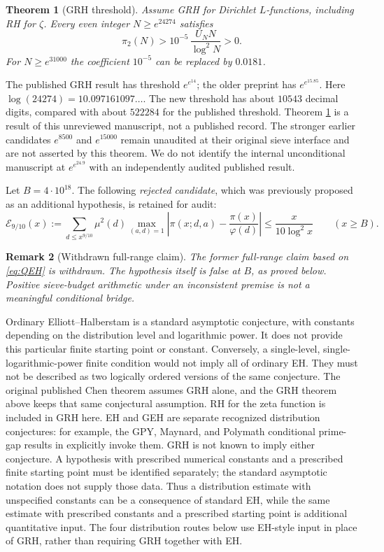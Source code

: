 \documentclass[11pt]{article}
\newtheorem{theorem}{Theorem}
\newtheorem{remark}[theorem]{Remark}
\begin{document}
\begin{theorem}[GRH threshold]\label{thm:grh}
Assume GRH for Dirichlet $L$-functions, including RH for $\zeta$.
Every even integer $N\ge e^{24274}$ satisfies
\[
\pi_2(N)>10^{-5}\,\frac{U_NN}{\log^2N}>0.
\]
For $N\ge e^{31000}$ the coefficient $10^{-5}$ can be replaced by $0.0181$.
\end{theorem}
The published GRH result \cite{BSpub} has threshold $e^{e^{14}}$;
the older preprint \cite{BS} has $e^{e^{15.85}}$.
Here $\log(24274)=10.097161097\ldots$. The new threshold has about
$10543$ decimal digits, compared with about $522284$ for the published
threshold. Theorem \ref{thm:grh} is a result of this unreviewed manuscript,
not a published record. The stronger earlier candidates $e^{8500}$ and
$e^{15000}$ remain unaudited at their original sieve interface and are
not asserted by this theorem.
We do not identify the internal unconditional manuscript at
$e^{e^{24.9}}$ with an independently audited published result.

Let $B=4\cdot10^{18}$. The following \emph{rejected candidate}, which
was previously proposed as an additional hypothesis, is retained for audit:
\begin{equation}\label{eq:QEH}
\mathcal E_{9/10}(x):=
\sum_{d\le x^{9/10}}\mu^2(d)
\max_{(a,d)=1}\left|\pi(x;d,a)-\frac{\pi(x)}{\varphi(d)}\right|
\le\frac{x}{10\log^2x}\qquad(x\ge B).
\tag{QEH$_B$}
\end{equation}
\begin{remark}[Withdrawn full-range claim]\label{thm:bridge}
The former full-range claim based on \eqref{eq:QEH} is withdrawn.
The hypothesis itself is false at $B$, as proved below. Positive
sieve-budget arithmetic under an inconsistent premise is not a
meaningful conditional bridge.
\end{remark}
Ordinary Elliott--Halberstam is a standard asymptotic conjecture,
with constants depending on the distribution level and logarithmic
power. It does not provide this particular finite starting point
or constant. Conversely, a single-level, single-logarithmic-power
finite condition would not imply all of ordinary EH. They must not
be described as two logically ordered versions of the same conjecture.
The original published Chen theorem assumes GRH alone, and the GRH
theorem above keeps that same conjectural assumption. RH for the zeta
function is included in GRH here. EH and GEH are separate recognized
distribution conjectures: for example, the GPY, Maynard, and Polymath
conditional prime-gap results in \cite{Polymath} explicitly invoke
them. GRH is not known to imply either conjecture. A hypothesis with
prescribed numerical constants and a prescribed finite starting point
must be identified separately; the standard asymptotic notation does
not supply those data.
Thus a distribution estimate with unspecified constants can be a
consequence of standard EH, while the same estimate with prescribed
constants and a prescribed starting point is additional quantitative
input. The four distribution routes below use EH-style input in place
of GRH, rather than requiring GRH together with EH.
\end{document}
